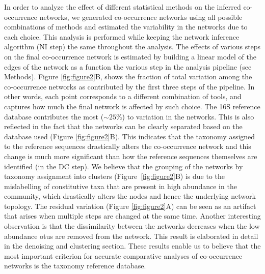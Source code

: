   In order to analyze the effect of different statistical methods on the inferred co-occurrence networks, we generated co-occurrence networks using all possible combinations of methods and estimated the variability in the networks due to each choice.
  This analysis is performed while keeping the network inference algorithm (NI step) the same throughout the analysis.
  The effects of various steps on the final co-occurrence network is estimated by building a linear model of the edges of the network as a function the various step in the analysis pipeline (see Methods).
  Figure \ref{fig:figure2}B, shows the fraction of total variation among the co-occurrence networks as contributed by the first three steps of the pipeline. In other words, each point corresponds to a different combination of tools, and captures how much the final network is affected by such choice.
  The 16S reference database contributes the most ($\sim25\%$) to variation in the networks. This is also reflected in the fact that the networks can be clearly separated based on the database used (Figure \ref{fig:figure2}B).
  This indicates that the taxonomy assigned to the reference sequences drastically alters the co-occurrence network and this change is much more significant than how the reference sequences themselves are identified (in the DC step).
  We believe that the grouping of the networks by taxonomy assignment into clusters (Figure~\ref{fig:figure2}B) is due to the mislabelling of constitutive taxa that are present in high abundance in the community, which drastically alters the nodes and hence the underlying network topology.
  The residual variation (Figure \ref{fig:figure2}A) can be seen as an artifact that arises when multiple steps are changed at the same time.
  Another interesting observation is that the dissimilarity between the networks decreases when the low abundance \ac{otu}s are removed from the network. This result is elaborated in detail in the denoising and clustering section.
  These results enable us to believe that the most important criterion for accurate comparative analyses of co-occurrence networks is the taxonomy reference database.

